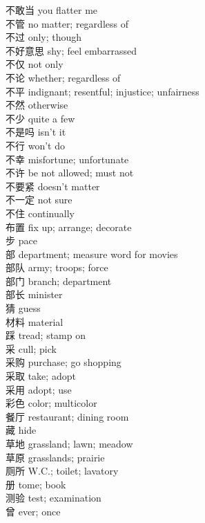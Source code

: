 不敢当 \quad you flatter me\\
不管 \quad no matter; regardless of\\
不过 \quad only; though\\
不好意思 \quad shy; feel embarrassed\\
不仅 \quad not only\\
不论 \quad whether; regardless of\\
不平 \quad indignant; resentful; injustice; unfairness\\
不然 \quad otherwise\\
不少 \quad quite a few\\
不是吗 \quad isn't it\\
不行 \quad won't do\\
不幸 \quad misfortune; unfortunate\\
不许 \quad be not allowed; must not\\
不要紧 \quad doesn't matter\\
不一定 \quad not sure\\
不住 \quad continually\\
布置 \quad fix up; arrange; decorate\\
步 \quad pace\\
部 \quad department; measure word for movies\\
部队 \quad army; troops; force\\
部门 \quad branch; department\\
部长 \quad minister\\
猜 \quad guess\\
材料 \quad material\\
踩 \quad tread; stamp on\\
采 \quad cull; pick\\
采购 \quad purchase; go shopping\\
采取 \quad take; adopt\\
采用 \quad adopt; use\\
彩色 \quad color; multicolor\\
餐厅 \quad restaurant; dining room\\
藏 \quad hide\\
草地 \quad grassland; lawn; meadow\\
草原 \quad grasslands; prairie\\
厕所 \quad W.C.; toilet; lavatory\\
册 \quad tome; book\\
测验 \quad test; examination\\
曾 \quad ever; once\\
